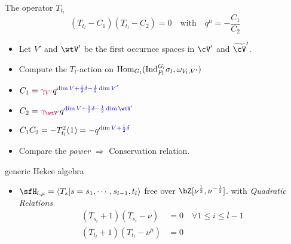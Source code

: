 \documentclass[t,mathserif,11pt,usenames,dvipsnames]{beamer}
\theoremstyle{plain}
\theoremstyle{definition}
\def\Hom{{\rm Hom}}
\def\Ind{{\rm Ind}}
\def\Hom{{\mathrm{Hom}}}
\def\half{{\frac{1}{2}}}
\def\blue{\color{blue}}
\let\oldemph\emph
\def\emph#1{\oldemph{\blue #1}}
\begin{document}
\begin{frame}{The operator $T_{t_{l}}$}
  \[
    (T_{t_{l}} - C_1)(T_{t_{l}} - C_2) = 0 \quad \text{with}\quad q^{\mu} = -\frac{C_{1}}{C_{2}}
  \]
  \begin{itemize}[<+->]
    \item Let $V'$ and $\wtV'$ be the first occurnce spaces in $\cV'$ and
    $\wtcV'$.
    \item Compute the $T_{l}$-action on
          $\Hom_{G_{l}}(\Ind_{P_{l}}^{G_{l}}\sigma_{l}, \omega_{V_{l},V'})$
    \item[] $C_1 = {\color{purple}\gamma_{V'} } q^{\blue \dim V+\half \delta-\half \dim V'}$
    \item[] $C_2 = {\color{purple}\gamma_{\wtV'}}q^{\blue \dim V+\half \delta-\half \dim \wtV'}$
    \item[] $ C_{1}C_{2} = - T_{t_{l}}^{2}(1) = -q^{\blue \dim V+\half \delta} $ \pause
    \item Compare the \emph{power} $\Rightarrow$ Conservation relation.
  \end{itemize}
\end{frame}


\begin{frame}{generic Hekce algebra}
  \begin{itemize}
    \item  $\sfH_{l,\mu} = \braket{T_s | s = s_{1}, \cdots, s_{l-1}, t_{l}}$
          free over $\bZ[\nu^{\half},\nu^{-\half}]$.
    with \emph{Quadratic Relations}
           \[
          \begin{split}
            (T_{s_{i}} +1 )(T_{s_{i}} -  \nu) &= 0 \quad \forall 1\leq i \leq l-1\\
            (T_{t_{l}} + 1)(T_{t_{l}} -  \nu^{\mu}) &= 0
          \end{split} \]
  \end{itemize}
\end{frame}
\end{document}
